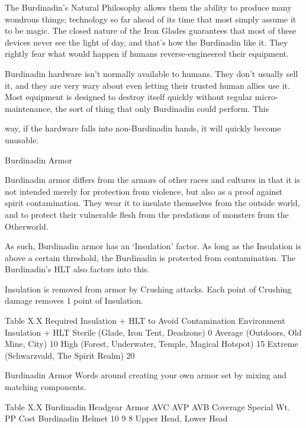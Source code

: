 \documentclass[oneside,11pt,english]{book}
\begin{document}
 

The Burdinadin’s Natural Philosophy allows them the ability to produce many wondrous things; 
technology so far ahead of its time that most simply assume it to be magic. The closed nature of the Iron 
Glades guarantees that most of these devices never see the light of day, and that’s how the Burdinadin 
like it. They rightly fear what would happen if humans reverse-engineered their equipment. 

 

Burdinadin hardware isn’t normally available to humans. They don’t usually sell it, and they are very 
wary about even letting their trusted human allies use it. Most equipment is designed to destroy itself 
quickly without regular micro-maintenance, the sort of thing that only Burdinadin could perform. This 


way, if the hardware falls into non-Burdinadin hands, it will quickly become unusable. 

 

Burdinadin Armor 

 

Burdinadin armor differs from the armors of other races and cultures in that it is not intended merely for 
protection from violence, but also as a proof against spirit contamination. They wear it to insulate 
themselves from the outside world, and to protect their vulnerable flesh from the predations of monsters 
from the Otherworld. 

 

As such, Burdinadin armor has an ‘Insulation’ factor. As long as the Insulation is above a certain 
threshold, the Burdinadin is protected from contamination. The Burdinadin’s HLT also factors into this. 

 

Insulation is removed from armor by Crushing attacks. Each point of Crushing damage removes 1 point 
of Insulation. 

 
Table X.X Required Insulation + HLT to Avoid Contamination 
Environment Insulation + HLT 
Sterile (Glade, Iron Tent, Deadzone) 0 
Average (Outdoors, Old Mine, City) 10 
High (Forest, Underwater, Temple, Magical Hotspot) 15 
Extreme (Schwarzvald, The Spirit Realm) 20 

 

 

Burdinadin Armor 
Words around creating your own armor set by mixing and matching components. 

 

Table X.X Burdinadin Headgear 
Armor AVC AVP AVB Coverage Special Wt. PP Cost 
Burdinadin Helmet 10 9 8 Upper Head, 
Lower Head 
\end{document}
